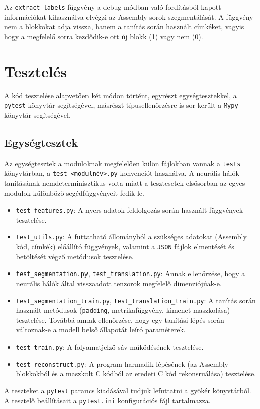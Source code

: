 Az \texttt{extract\_labels} függvény a debug módban való fordításból kapott információkat kihasználva
elvégzi az Assembly sorok szegmentálását. A függvény nem a blokkokat adja vissza, hanem a tanítás során
használt címkéket, vagyis hogy a megfelelő sorra kezdődik-e ott új blokk (1) vagy nem (0).

\section{Tesztelés}
A kód tesztelése alapvetően két módon történt, egyrészt egységtesztekkel, a
\texttt{pytest}\cite{pytest7.1} könyvtár segítségével, másrészt típusellenőrzésre is sor került
a \texttt{Mypy}\cite{mypy} könyvtár segítségével.

\subsection{Egységtesztek}
Az egységtesztek a moduloknak megfelelően külön
fájlokban vannak a \texttt{tests} könyvtárban, a \texttt{test\_<modulnév>.py} konvenciót használva.
A neurális hálók tanításának nemdeterminisztikus volta miatt a tesztesetek elsősorban az egyes modulok
különböző segédfüggvényeit fedik le.
\begin{itemize}
    \item \texttt{test\_features.py}: A nyers adatok feldolgozás során használt függvények tesztelése.
    \item \texttt{test\_utils.py}: A futtatható állományból a szükséges adatokat (Assembly kód, címkék)
        előállító függvények, valamint a \texttt{JSON} fájlok elmentését és betöltését végző metódusok
        tesztelése.
    \item \texttt{test\_segmentation.py}, \texttt{test\_translation.py}: Annak ellenőrzése, hogy a neurális hálók
        által visszaadott tenzorok megfelelő dimenziójúak-e.
    \item \texttt{test\_segmentation\_train.py}, \texttt{test\_translation\_train.py}: A tanítás során használt
        metódusok (\texttt{padding}, metrikafüggvény, kimenet maszkolása) tesztelése. Továbbá annak ellenőrzése,
        hogy egy tanítási lépés során változnak-e a modell belső állapotát leíró paraméterek.
    \item \texttt{test\_train.py}: A folyamatjelző sáv működésének tesztelése.
    \item \texttt{test\_reconstruct.py}: A program harmadik lépésének (az Assembly blokkokból és a 
        maszkolt C kódból az eredeti C kód rekonsruálása) tesztelése.
\end{itemize}
A teszteket a \texttt{pytest} parancs kiadásával tudjuk lefuttatni
a gyökér könyvtárból. A tesztelő beállításait a \texttt{pytest.ini} konfigurációs fájl tartalmazza.

